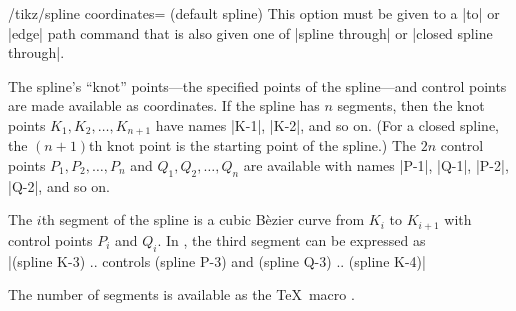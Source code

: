 \documentclass[a4paper]{ltxdoc}
\begin{document}
\begin{key}{/tikz/spline coordinates= (default spline)}
This option must be given to a |to| or |edge| path command that is also given
one of |spline through| or |closed spline through|.

The spline's ``knot'' points---the specified points of the spline---and
control points are made available as coordinates. If the spline has $n$
segments, then the knot points $K_1,K_2,\dotsc,K_{n+1}$ have names 
|K-1|,  |K-2|, and so on.
(For a closed spline, the $(n+1)$th knot point is the starting
point of the spline.) The $2n$ control points $P_1,P_2,\dotsc,P_n$ and
$Q_1,Q_2,\dotsc,Q_n$ 
are available with names  |P-1|,  |Q-1|,
 |P-2|,  |Q-2|, and so on.

The $i$th segment of the spline is a cubic B\`ezier curve from $K_i$ to
$K_{i+1}$ with control points $P_i$ and $Q_i$. In \tikzname, the third segment
can be expressed as\\[.5\baselineskip]
\begingroup
\frenchspacing
\null\quad |(spline K-3) .. controls (spline P-3) and (spline Q-3) .. (spline K-4)|
\endgroup

The number of segments is available as the \TeX\ macro
.

\begin{codeexample}[]
\end{codeexample}
\end{key}
\end{document}
